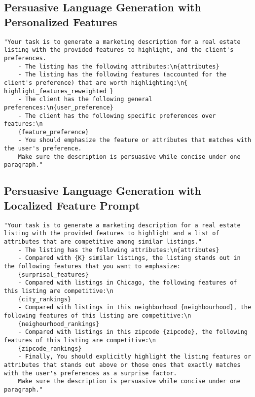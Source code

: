 \subsection{Persuasive Language Generation with Personalized Features}
\label{app: highlight-preference-prompt}
\begin{lstlisting}
"Your task is to generate a marketing description for a real estate listing with the provided features to highlight, and the client's preferences.
    - The listing has the following attributes:\n{attributes}
    - The listing has the following features (accounted for the client's preference) that are worth highlighting:\n{ highlight_features_reweighted }
    - The client has the following general preferences:\n{user_preference}
    - The client has the following specific preferences over features:\n    
    {feature_preference}
    - You should emphasize the feature or attributes that matches with the user's preference.
    Make sure the description is persuasive while concise under one paragraph."
\end{lstlisting}

\subsection{Persuasive Language Generation with Localized Feature Prompt}
\label{app: surprisal-prompt}

\begin{lstlisting}
"Your task is to generate a marketing description for a real estate listing with the provided features to highlight and a list of attributes that are competitive among similar listings."
    - The listing has the following attributes:\n{attributes}
    - Compared with {K} similar listings, the listing stands out in the following features that you want to emphasize:
    {surprisal_features}
    - Compared with listings in Chicago, the following features of this listing are competitive:\n
    {city_rankings}
    - Compared with listings in this neighborhood {neighbourhood}, the following features of this listing are competitive:\n
    {neighourhood_rankings}
    - Compared with listings in this zipcode {zipcode}, the following features of this listing are competitive:\n
    {zipcode_rankings}
    - Finally, You should explicitly highlight the listing features or attributes that stands out above or those ones that exactly matches with the user's preferences as a surprise factor.
    Make sure the description is persuasive while concise under one paragraph."
\end{lstlisting}

